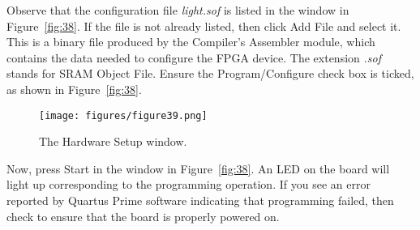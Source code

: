 Observe that the configuration file {\it light.sof} is listed in the window in
Figure~\ref{fig:38}. If the file is not already listed, then click {\sf Add File}
and select it.
This is a binary file produced by the Compiler's Assembler module, 
which contains the data needed to configure the FPGA device.
The extension {\it .sof} stands for SRAM Object File.
Ensure the {\sf Program/Configure} check box is ticked, as shown in Figure~\ref{fig:38}.

\begin{figure}[H]
   \begin{center}
      \texttt{[image: figures/figure39.png]}
   \caption{The Hardware Setup window.} 
	 \label{fig:39}
	 \end{center}
\end{figure}

Now, press {\sf Start} in the window in Figure~\ref{fig:38}.
An LED on the board will light up corresponding to the programming operation.
If you see an error reported by Quartus Prime software indicating that
programming failed, then check to ensure that the board is properly powered on.

